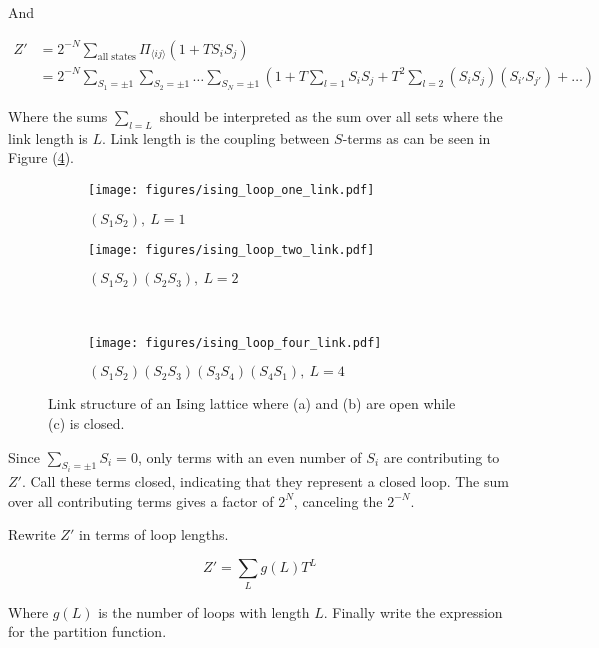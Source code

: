 And

\begin{align*}
    Z' &= 2^{-N} \sum_{\text{all states}} \Pi_{\langle ij \rangle} (1 + T S_i S_j) \\
    &= 2^{-N} \sum_{S_1 = \pm 1} \sum_{S_2 = \pm 1} \ldots \sum_{S_N = \pm 1} \left ( 1 + T \sum_{l = 1} S_i S_j + T^2 \sum_{l = 2} (S_i S_j)(S_{i'} S_{j'}) + \ldots \right ) 
\end{align*}

Where the sums $\sum_{l=L}$ should be interpreted as the sum over all sets where the link length is $L$. Link length is the coupling between $S$-terms as can be seen in Figure (\ref{fig:LinkIsing}).

\begin{figure}[h!]
    \begin{subfigure}{.5\linewidth}
        \centering
        \texttt{[image: figures/ising\_loop\_one\_link.pdf]}
        \caption{$(S_1 S_2), \ L = 1$}
        \label{fig:oneLinkIsing}
    \end{subfigure}%
    \begin{subfigure}{.5\linewidth}
        \centering
        \texttt{[image: figures/ising\_loop\_two\_link.pdf]}
        \caption{$(S_1 S_2)(S_2 S_3), \ L = 2$}
        \label{fig:twoLinkIsing}
    \end{subfigure}\\[1ex]
    \begin{subfigure}{\linewidth}
        \centering
        \texttt{[image: figures/ising\_loop\_four\_link.pdf]}
        \caption{$(S_1 S_2)(S_2 S_3)(S_3 S_4)(S_4 S_1), \ L = 4$}
    \label{fig:fourLinkIsing}
    \end{subfigure}
    \caption{Link structure of an Ising lattice where (a) and (b) are open while (c) is closed.}
    \label{fig:LinkIsing}
\end{figure}

Since $\sum_{S_i = \pm 1} S_i = 0$, only terms with an even number of $S_i$ are contributing to $Z'$. Call these terms closed, indicating that they represent a closed loop. The sum over all contributing terms gives a factor of $2^N$, canceling the $2^{-N}$.

Rewrite $Z'$ in terms of loop lengths.

\begin{equation}
    Z' = \sum_L g(L) T^L
\end{equation}

Where $g(L)$ is the number of loops with length $L$. Finally write the expression for the partition function.

